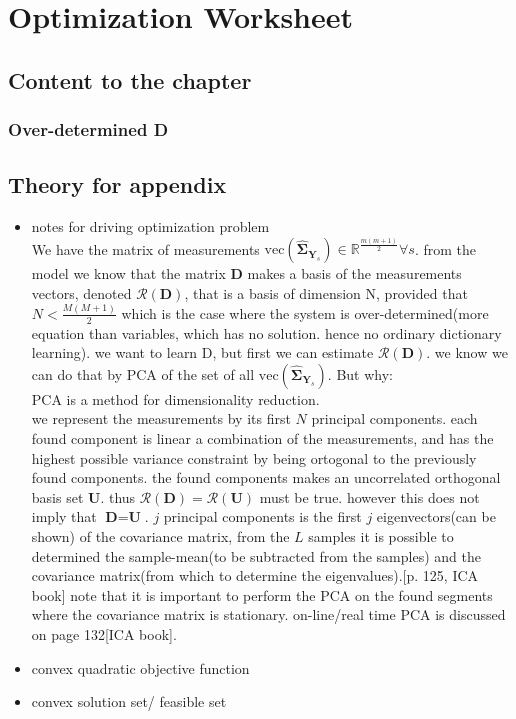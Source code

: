 \chapter*{Optimization Worksheet}
\section{Content to the chapter}
\subsection{Over-determined \textbf{D}}


\section{Theory for appendix}
\begin{itemize}
\item notes for driving optimization problem\\
We have the matrix of measurements $\text{vec}(\widehat{\boldsymbol{\Sigma}}_{\textbf{Y}_s})\in \mathbb{R}^{\frac{m(m+1)}{2}} \forall s$. from the model we know that the matrix $\textbf{D}$ makes a basis of the measurements vectors, denoted $\mathcal{R}(\textbf{D})$, that is a basis of dimension N, provided that $N < \frac{M(M+1)}{2}$ which is the case where the system is over-determined(more equation than variables, which has no solution. hence no ordinary dictionary learning). 
we want to learn D, but first we can estimate $\mathcal{R}(\textbf{D})$. 
we know we can do that by PCA of the set of all $\text{vec}(\widehat{\boldsymbol{\Sigma}}_{\textbf{Y}_s})$. 
But why:\\
PCA is a method for dimensionality reduction. \\
we represent the measurements by its first $N$ principal components. 
each found component is linear a combination of the measurements, and has the highest possible variance constraint by being ortogonal to the previously found components. the found components makes an uncorrelated orthogonal basis set $\textbf{U}$. 
thus  $\mathcal{R}(\textbf{D}) = \mathcal{R}(\textbf{U})$ must be true. however this does not imply that $\textbf{D}=\textbf{U}$. 
$j$ principal components is the first $j$ eigenvectors(can be shown) of the covariance matrix, from the $L$ samples it is possible to determined the sample-mean(to be subtracted from the samples) and the covariance matrix(from which to determine the eigenvalues).[p. 125, ICA book]
note that it is important to perform the PCA on the found segments where the covariance matrix is stationary. on-line/real time PCA is discussed on page 132[ICA book].	 
 

      



\item convex quadratic objective function
\item convex solution set/ feasible set 

\end{itemize}
